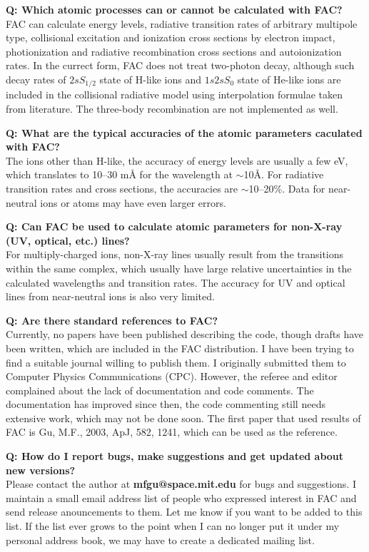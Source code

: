 \documentclass[twoside,letterpaper]{refrep}
\newcounter{faq}[section]
\newcommand{\faq}[2]{\stepcounter{faq}
	\begin{minipage}{\textwidth}
	\textbf{Q\arabic{faq}: #1?}\\#2
	\end{minipage}}
\begin{document}
\faq{Which atomic processes can or cannot be calculated with FAC}{
FAC can calculate energy levels, radiative transition rates of arbitrary
multipole type, collisional excitation and ionization cross sections by
electron impact, photionization and radiative recombination cross sections and
autoionization rates. In the currect form, FAC does not treat two-photon
decay, although such decay rates of $2s S_{1/2}$ state of H-like ions and
$1s2s S_{0}$ state of He-like ions are included in the collisional radiative
model using interpolation formulae taken from literature. The three-body
recombination are not implemented as well.}

\faq{What are the typical accuracies of the atomic parameters caculated with
FAC}{
The ions other than H-like, the accuracy of energy levels are usually a few
eV, which translates to 10--30 m{\AA} for the wavelength at $\sim$10{\AA}. For
radiative transition rates and cross sections, the accuracies are
$\sim$10--20\%. Data for near-neutral ions or atoms may have even larger
errors.}

\faq{Can FAC be used to calculate atomic parameters for non-X-ray (UV,
optical, etc.) lines}{
For multiply-charged ions, non-X-ray lines usually result from the transitions
within the same complex, which usually have large relative uncertainties in
the calculated wavelengths and transition rates. The accuracy for UV and
optical lines from near-neutral ions is also very limited.}

\faq{Are there standard references to FAC}{
Currently, no papers have been published describing the code, though
drafts have been written, which are included in the FAC distribution. I have
been trying to find a suitable journal willing to publish
them. I originally submitted them to Computer Physics Communications
(CPC). However, the referee and editor complained about the lack of
documentation and code comments. The documentation has improved since
then, the code commenting still needs extensive work, which may not be done
soon. The first paper that used results of FAC is Gu, M.F., 2003, ApJ, 582,
1241, which can be used as the reference.}

\faq{How do I report bugs, make suggestions and get updated about new
versions}{
Please contact the author at \textbf{mfgu@space.mit.edu} for bugs and
suggestions. I maintain a small email address list of people who expressed
interest in FAC and send release anouncements to them. Let me know if you want
to be added to this list. If the list ever grows to the point when I can no
longer put it under my personal address book, we may have to create a
dedicated mailing list.}
\end{document}
